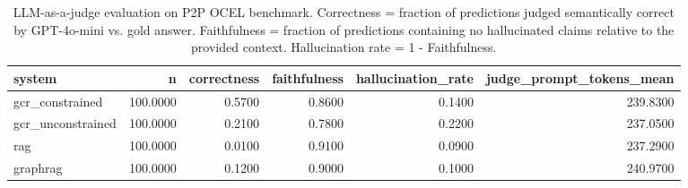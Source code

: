 \begin{table}
\caption{LLM-as-a-judge evaluation on P2P OCEL benchmark. Correctness = fraction of predictions judged semantically correct by GPT-4o-mini vs. gold answer. Faithfulness = fraction of predictions containing no hallucinated claims relative to the provided context. Hallucination rate = 1 - Faithfulness.}
\label{tab:judge_results}
\begin{tabular}{lrrrrr}
\toprule
system & n & correctness & faithfulness & hallucination_rate & judge_prompt_tokens_mean \\
\midrule
gcr_constrained & 100.0000 & 0.5700 & 0.8600 & 0.1400 & 239.8300 \\
gcr_unconstrained & 100.0000 & 0.2100 & 0.7800 & 0.2200 & 237.0500 \\
rag & 100.0000 & 0.0100 & 0.9100 & 0.0900 & 237.2900 \\
graphrag & 100.0000 & 0.1200 & 0.9000 & 0.1000 & 240.9700 \\
\bottomrule
\end{tabular}
\end{table}
